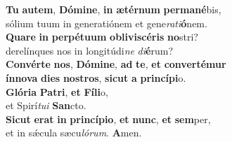 \oddverse \textbf{Tu} \textbf{au}\textbf{tem}, \textbf{Dó}\textbf{mi}\textbf{ne}, \textbf{in} \textbf{æ}\textbf{tér}\textbf{num} \textbf{per}\textbf{ma}\textbf{né}bis,~\*\\
\oddverse sólium tuum in generatiónem et gene\textit{ra}\textit{ti}\textbf{ó}nem.\\
\evenverse \textbf{Qua}\textbf{re} \textbf{in} \textbf{per}\textbf{pé}\textbf{tu}\textbf{um} \textbf{o}\textbf{bli}\textbf{vi}\textbf{scé}\textbf{ris} \textbf{no}stri?~\*\\
\evenverse derelínques nos in longitúdi\textit{ne} \textit{di}\textbf{é}rum?\\
\oddverse \textbf{Con}\textbf{vér}\textbf{te} \textbf{nos}, \textbf{Dó}\textbf{mi}\textbf{ne}, \textbf{ad} \textbf{te}, \textbf{et} \textbf{con}\textbf{ver}\textbf{té}\textbf{mur}~\*\\
\oddverse \textbf{ín}\textbf{no}\textbf{va} \textbf{di}\textbf{es} \textbf{no}\textbf{stros}, \textbf{si}\textbf{cut} \textbf{a} \textbf{prin}\textbf{cí}\textbf{pi}o.\\
\evenverse \textbf{Gló}\textbf{ri}\textbf{a} \textbf{Pa}\textbf{tri}, \textbf{et} \textbf{Fí}\textbf{li}o,~\*\\
\evenverse et Spirí\textit{tu}\textit{i} \textbf{San}cto.\\
\oddverse \textbf{Si}\textbf{cut} \textbf{e}\textbf{rat} \textbf{in} \textbf{prin}\textbf{cí}\textbf{pi}\textbf{o}, \textbf{et} \textbf{nunc}, \textbf{et} \textbf{sem}per,~\*\\
\oddverse et in sǽcula sæcu\textit{ló}\textit{rum}. \textbf{A}men.\\
